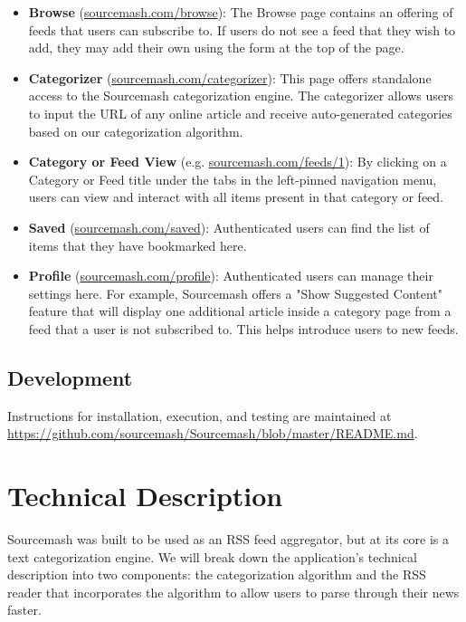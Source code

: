 \documentclass[11pt]{article}
\begin{document}
\begin{itemize}
	\item \textbf{Browse} (\url{sourcemash.com/browse}): The Browse page contains an offering of feeds that users can subscribe to. If users do not see a feed that they wish to add, they may add their own using the form at the top of the page.
	\item \textbf{Categorizer} (\url{sourcemash.com/categorizer}): This page offers standalone access to the Sourcemash categorization engine. The categorizer allows users to input the URL of any online article and receive auto-generated categories based on our categorization algorithm.
	\item \textbf{Category or Feed View} (e.g. \url{sourcemash.com/feeds/1}): By clicking on a Category or Feed title under the tabs in the left-pinned navigation menu, users can view and interact with all items present in that category or feed.
	\item \textbf{Saved} (\url{sourcemash.com/saved}): Authenticated users can find the list of items that they have bookmarked here.
	\item \textbf{Profile} (\url{sourcemash.com/profile}): Authenticated users can manage their settings here. For example, Sourcemash offers a "Show Suggested Content" feature that will display one additional article inside a category page from a feed that a user is not subscribed to. This helps introduce users to new feeds.
\end{itemize}

\subsection{Development}

Instructions for installation, execution, and testing are maintained at \url{https://github.com/sourcemash/Sourcemash/blob/master/README.md}.



\section{Technical Description}

Sourcemash was built to be used as an RSS feed aggregator, but at its core is a text categorization engine. We will break down the application's technical description into two components: the categorization algorithm and the RSS reader that incorporates the algorithm to allow users to parse through their news faster.
\end{document}
